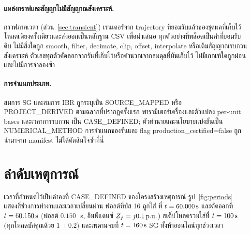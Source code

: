 \documentclass[12pt,a4paper]{article}
\newcommand{\code}[1]{{\ttfamily\small\hyphenchar\font=-1 #1}}
\newcommand{\pu}{\ifmmode\,\mathrm{p.u.}\else\ p.u.\fi}
\newcommand{\second}{\ifmmode\,\mathrm{s}\else\ s\fi}
\begin{document}
\paragraph{แหล่งกราฟและสัญญาไม่มีสัญญาณสังเคราะห์.}
กราฟภาคเวลา (ส่วน~\ref{sec:transient}) เรนเดอร์จาก trajectory ที่ยอมรับแล้วของชุดผลที่เก็บไว้
โหลดเพียงครั้งเดียวและส่งออกเป็นหลักฐาน CSV เพื่อนำเสนอ ทุกตัวอย่างที่พล็อตเป็นค่าที่ยอมรับดิบ
ไม่มีสิ่งใดถูก smooth, filter, decimate, clip, offset, interpolate หรือเติมสัญญาณรบกวนสังเคราะห์
ตัวเลขทุกตัวคัดลอกจากรันที่เก็บไว้หรือคำนวณจากสมดุลที่มันเก็บไว้ ไม่มีเกณฑ์ใดถูกผ่อน
และไม่มีการจำลองซ้ำ

\paragraph{การจำแนกประเภท.}
สมการ SG และสมการ IBR ถูกระบุเป็น \textsf{SOURCE\_MAPPED} หรือ \textsf{PROJECT\_DERIVED}
ตามฉลากที่ปรากฏครั้งแรก พารามิเตอร์เครื่องและตัวแปลง per-unit bases และเวลาการรบกวน
เป็น \textsf{CASE\_DEFINED}; ตัวทำนายและนโยบายแบ่งขั้นเป็น \textsf{NUMERICAL\_METHOD}
การจำแนกของรันและ flag \code{production\_certified=false} ถูกนำมาจาก manifest
ไม่ได้ตัดสินใจซ้ำที่นี่

\section{ลำดับเหตุการณ์}\label{sec:chrono}
เวลาที่กำหนดไว้เป็นค่าคงที่ \textsf{CASE\_DEFINED} ของโครงสร้างเหตุการณ์
รูป~\ref{fig:periods} แสดงสี่ช่วงการทำงานและเวลาเปลี่ยนผ่าน ฟอลต์ที่บัส 16 ถูกใส่
ที่ $t=60.000\second$ และตัดออกที่ $t=60.150\second$ (ฟอลต์ $0.150$\second,
อิมพีแดนซ์ $Z_f=j0.1\pu$) สเต็ปโหลดรวมใส่ที่ $t=100\second$
(ทุกโหลดบัสคูณด้วย $1+0.2$) และเพดานจบที่ $t=160\second$
SG ทั้งห้าออนไลน์ทุกช่วงเวลา
\end{document}
